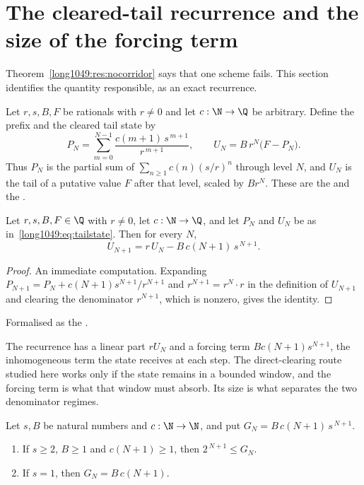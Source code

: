 \section{The cleared-tail recurrence and the size of the forcing
term}\label{long1049:sec:tail}

Theorem~\ref{long1049:res:nocorridor} says that one scheme fails.  This section
identifies the quantity responsible, as an exact recurrence.

Let $r,s,B,F$ be rationals with $r\ne0$ and let $c:\N\to\Q$ be arbitrary.
Define the prefix and the cleared tail state by
\[
 P_N=\sum_{m=0}^{N-1}\frac{c(m+1)\,s^{\,m+1}}{r^{\,m+1}},
 \qquad
 U_N=B\,r^{N}\bigl(F-P_N\bigr).
\tag{$\ast$}\label{long1049:eq:tailstate}
\]
Thus $P_N$ is the partial sum of $\sum_{n\ge1}c(n)(s/r)^{n}$ through level $N$,
and $U_N$ is the tail of a putative value $F$ after that level, scaled by
$Br^{N}$.  These are the
 and the
.

\begin{theorem}\label{long1049:res:tailrec}
Let $r,s,B,F\in\Q$ with $r\ne0$, let $c:\N\to\Q$, and let $P_N$ and $U_N$ be as
in~\eqref{long1049:eq:tailstate}.  Then for every $N$,
\[
 U_{N+1}=r\,U_N-B\,c(N+1)\,s^{\,N+1}.
\]
\end{theorem}

\begin{proof}
An immediate computation.  Expanding
$P_{N+1}=P_N+c(N+1)s^{N+1}/r^{N+1}$ and $r^{N+1}=r^{N}\cdot r$ in the
definition of $U_{N+1}$ and clearing the denominator $r^{N+1}$, which is
nonzero, gives the identity.
\end{proof}

\noindent Formalised as the
.

The recurrence has a linear part $rU_N$ and a forcing term $Bc(N+1)s^{N+1}$,
the inhomogeneous term the state receives at each step.
The direct-clearing route studied here works only if the state remains in a
bounded window, and the forcing term is what that window must absorb.  Its
size is what separates the two denominator regimes.

\begin{theorem}\label{long1049:res:forcing}
Let $s,B$ be natural numbers and $c:\N\to\N$, and put
$G_N=B\,c(N+1)\,s^{\,N+1}$.
\begin{enumerate}
\item If $s\ge2$, $B\ge1$ and $c(N+1)\ge1$, then $2^{\,N+1}\le G_N$.
\item If $s=1$, then $G_N=B\,c(N+1)$.
\end{enumerate}
\end{theorem}

